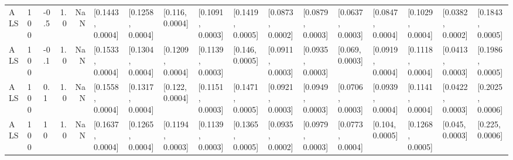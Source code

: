 \begin{tabular}{lllrrllllllllllll}
       ALS &  100 &  -0.5 &   1.0 &   NaN &  [0.1443, 0.0004] &  [0.1258, 0.0004] &   [0.116, 0.0004] &  [0.1091, 0.0003] &  [0.1419, 0.0005] &  [0.0873, 0.0002] &  [0.0879, 0.0003] &  [0.0637, 0.0003] &  [0.0847, 0.0004] &  [0.1029, 0.0004] &  [0.0382, 0.0002] &  [0.1843, 0.0005] \\
       ALS &  100 &  -0.1 &   1.0 &   NaN &  [0.1533, 0.0004] &  [0.1304, 0.0004] &  [0.1209, 0.0004] &  [0.1139, 0.0003] &   [0.146, 0.0005] &  [0.0911, 0.0003] &  [0.0935, 0.0003] &   [0.069, 0.0003] &  [0.0919, 0.0004] &  [0.1118, 0.0004] &  [0.0413, 0.0003] &  [0.1986, 0.0005] \\
       ALS &  100 &   0.1 &   1.0 &   NaN &  [0.1558, 0.0004] &  [0.1317, 0.0004] &   [0.122, 0.0004] &  [0.1151, 0.0003] &  [0.1471, 0.0005] &  [0.0921, 0.0003] &  [0.0949, 0.0003] &  [0.0706, 0.0003] &  [0.0939, 0.0004] &  [0.1141, 0.0004] &  [0.0422, 0.0003] &  [0.2025, 0.0006] \\
       ALS &  100 &    10 &   1.0 &   NaN &  [0.1637, 0.0004] &  [0.1265, 0.0004] &  [0.1194, 0.0003] &  [0.1139, 0.0003] &  [0.1365, 0.0005] &  [0.0935, 0.0002] &  [0.0979, 0.0003] &  [0.0773, 0.0004] &   [0.104, 0.0005] &  [0.1268, 0.0005] &   [0.045, 0.0003] &   [0.225, 0.0006] \\
\bottomrule
\end{tabular}
